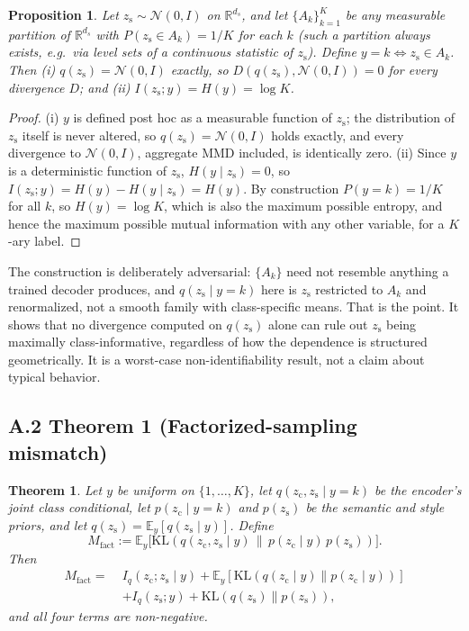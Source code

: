 \documentclass[letterpaper]{article}
\newtheorem{theorem}{Theorem}
\newtheorem{proposition}{Proposition}
\newcommand{\zc}{z_{\mathrm{c}}}
\newcommand{\zs}{z_{\mathrm{s}}}
\newcommand{\R}{\mathbb{R}}
\newcommand{\KL}{\mathrm{KL}}
\begin{document}
\begin{proposition}
Let $\zs\sim\mathcal N(0,I)$ on $\R^{d_s}$, and let $\{A_k\}_{k=1}^K$ be any
measurable partition of $\R^{d_s}$ with $P(\zs\in A_k)=1/K$ for each $k$
(such a partition always exists, e.g.\ via level sets of a continuous
statistic of $\zs$). Define $y=k \iff \zs\in A_k$. Then (i) $q(\zs)=\mathcal
N(0,I)$ exactly, so $D(q(\zs),\mathcal N(0,I))=0$ for every divergence $D$;
and (ii) $I(\zs;y)=H(y)=\log K$.
\end{proposition}

\begin{proof}
(i) $y$ is defined post hoc as a measurable function of $\zs$; the
distribution of $\zs$ itself is never altered, so $q(\zs)=\mathcal N(0,I)$
holds exactly, and every divergence to $\mathcal N(0,I)$, aggregate MMD
included, is identically zero. (ii) Since $y$ is a deterministic function of
$\zs$, $H(y\mid\zs)=0$, so $I(\zs;y)=H(y)-H(y\mid\zs)=H(y)$. By construction
$P(y=k)=1/K$ for all $k$, so $H(y)=\log K$, which is also the maximum
possible entropy, and hence the maximum possible mutual information with any
other variable, for a $K$-ary label.
\end{proof}

The construction is deliberately adversarial: $\{A_k\}$ need not resemble
anything a trained decoder produces, and $q(\zs\mid y{=}k)$ here is $\zs$
restricted to $A_k$ and renormalized, not a smooth family with class-specific
means. That is the point. It shows that no divergence computed on $q(\zs)$
alone can rule out $\zs$ being maximally class-informative, regardless of how
the dependence is structured geometrically. It is a worst-case
non-identifiability result, not a claim about typical behavior.

\subsection{A.2 Theorem 1 (Factorized-sampling mismatch)}

\begin{theorem}
Let $y$ be uniform on $\{1,\dots,K\}$, let $q(\zc,\zs\mid y{=}k)$ be the
encoder's joint class conditional, let $p(\zc\mid y{=}k)$ and $p(\zs)$ be the
semantic and style priors, and let $q(\zs)=\mathbb E_y[q(\zs\mid y)]$. Define
\[
M_{\mathrm{fact}} := \mathbb E_y\bigl[\KL(q(\zc,\zs\mid y)\,\|\,p(\zc\mid y)\,p(\zs))\bigr].
\]
Then
\begin{align*}
M_{\mathrm{fact}} =\;& I_q(\zc;\zs\mid y)
 + \mathbb E_y[\KL(q(\zc\mid y)\|p(\zc\mid y))]\\
 &+ I_q(\zs;y) + \KL(q(\zs)\|p(\zs)),
\end{align*}
and all four terms are non-negative.
\end{theorem}
\end{document}
